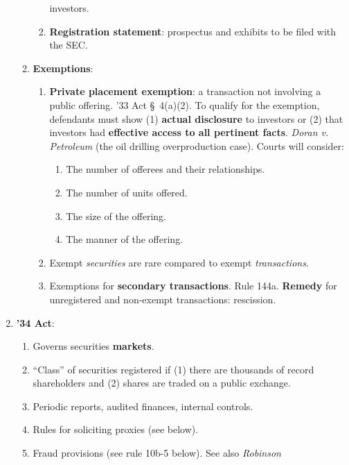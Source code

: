 \begin{enumerate}
\begin{enumerate}
\begin{enumerate}
            investors.
            \item \textbf{Registration statement}: prospectus and exhibits 
            to be filed with the SEC.
        \end{enumerate}
        \item \textbf{Exemptions}:
        \begin{enumerate}
            \item \textbf{Private placement exemption}: a transaction not 
            involving a public offering. '33 Act \S\ 4(a)(2). To qualify for 
            the exemption, defendants must show (1) \textbf{actual disclosure} 
            to investors or (2) that investors had \textbf{effective access to 
            all pertinent facts}. \emph{Doran v. Petroleum} (the oil drilling 
            overproduction case). Courts will consider:
            \begin{enumerate}
                \item The number of offerees and their relationships.
                \item The number of units offered.
                \item The size of the offering.
                \item The manner of the offering.
            \end{enumerate}
            \item Exempt \emph{securities} are rare compared to exempt 
            \emph{transactions}.
            \item Exemptions for \textbf{secondary transactions}. Rule 144a.
            \textbf{Remedy} for unregistered and non-exempt transactions: 
            rescission.
        \end{enumerate}
    \end{enumerate}
    \item \textbf{'34 Act}:
    \begin{enumerate}
        \item Governs securities \textbf{markets}.
        \item ``Class'' of securities registered if (1) there are thousands of 
        record shareholders and (2) shares are traded on a public exchange.
        \item Periodic reports, audited finances, internal controls.
        \item Rules for soliciting proxies (see below).
        \item Fraud provisions (see rule 10b-5 below). See also \emph{Robinson 
}
\end{enumerate}
\end{enumerate}
